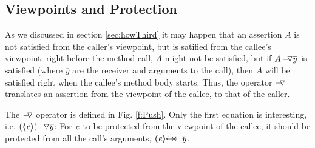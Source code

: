    
 \subsection{Viewpoints and Protection}
 
 As we discussed in section \ref{sec:howThird} it may happen that an assertion $A$ is not satisfied from the caller’s
viewpoint, but is satified from the callee’s viewpoint:  right before the method call, $A$ might   not be satisfied,
but if  $\PushASLong  {\overline y} A$ is satisfied (where $\overline y$ are the receiver and arguments to the call), then $A$
will be satisfied right when the callee’s method body starts. Thus, the operator $\pushSymbolAA$
 translates an assertion from the viewpoint of the callee, to that of the caller.
 


The  $\pushSymbolAA$  operator is  defined in Fig. \ref{f:Push}. 
Only the first equation is interesting, i.e.  $\PushAS y {(\inside \re)}$: For 
$\re$ to be protected from the viewpoint of the callee, it should be protected from all the call's arguments,
\ie  $\protectedFrom {\re} {\overline {y}}$. 


